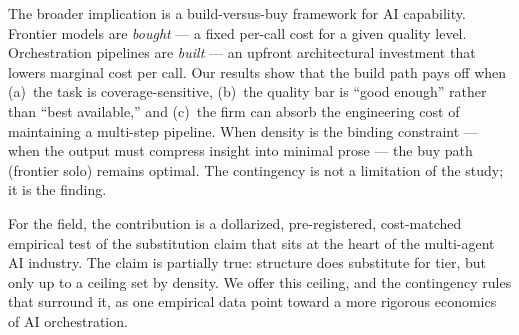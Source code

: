 \documentclass[12pt,a4paper]{article}
\begin{document}
The broader implication is a build-versus-buy framework for AI capability.
Frontier models are \emph{bought} --- a fixed per-call cost for a given quality
level. Orchestration pipelines are \emph{built} --- an upfront architectural
investment that lowers marginal cost per call. Our results show that the build
path pays off when (a)~the task is coverage-sensitive, (b)~the quality bar is
``good enough'' rather than ``best available,'' and (c)~the firm can absorb the
engineering cost of maintaining a multi-step pipeline. When density is the
binding constraint --- when the output must compress insight into minimal prose
--- the buy path (frontier solo) remains optimal. The contingency is not a
limitation of the study; it is the finding.

For the field, the contribution is a dollarized, pre-registered, cost-matched
empirical test of the substitution claim that sits at the heart of the
multi-agent AI industry. The claim is partially true: structure does substitute
for tier, but only up to a ceiling set by density. We offer this ceiling, and
the contingency rules that surround it, as one empirical data point toward a
more rigorous economics of AI orchestration.
\end{document}
